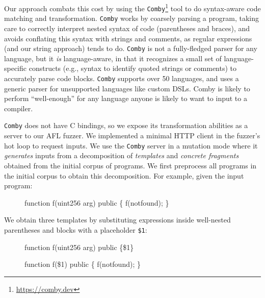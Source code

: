 Our approach combats this cost by using the
\texttt{Comby}\footnote{\href{https://comby.dev}{https://comby.dev}} tool to do
syntax-aware code matching and transformation. \texttt{Comby} works by coarsely
parsing a program, taking care to correctly interpret nested syntax of code
(parentheses and braces), and avoids conflating this syntax with strings and
comments, as regular expressions (and our string approach) tends to do.  \texttt{Comby} is not a fully-fledged
parser for any language, but it \emph{is} language-aware, in that it recognizes
a small set of language-specific constructs (e.g., syntax to identify quoted
strings or comments) to accurately parse code blocks. \texttt{Comby} supports
over 50 languages, and uses a generic parser for unsupported languages like custom
DSLs.  Comby is likely to perform ``well-enough'' for any language
anyone is likely to want to input to a compiler.

\texttt{Comby} does not have C bindings, so we expose its transformation
abilities as a server to our AFL fuzzer. We implemented a minimal HTTP client
in the fuzzer's hot loop to request inputs. We use the \texttt{Comby} server in
a mutation mode where it \emph{generates} inputs from a decomposition of
\emph{templates} and \emph{concrete fragments} obtained from the initial corpus
of programs. We first preprocess all programs in the initial corpus to obtain
this decomposition. For example, given the input program:

\begin{figure}[ht!]
 {\scriptsize
\begin{code}
function f(uint256 arg) public \{
    f(notfound);
\}
\end{code}
}
\end{figure}

We obtain three templates by substituting expressions inside well-nested parentheses and blocks with a placeholder \texttt{\$1}:


\begin{figure}[ht!]
  {\scriptsize
\begin{code}
function f(uint256 arg) public \{\$1\} 
\end{code}
}
\end{figure}

\begin{figure}[ht!]
  {\scriptsize
\begin{code}
function f(\$1) public \{
    f(notfound);
\} 
\end{code}
}
\end{figure}

